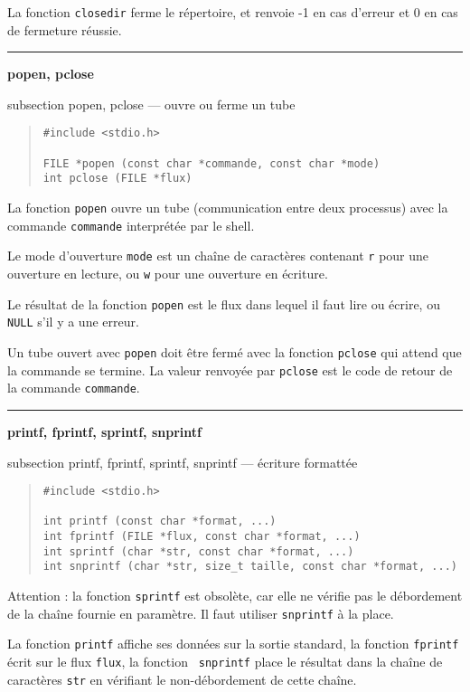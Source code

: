 \documentclass [twoside] {report}
\newcommand {\primitive} [1]
    {
	{\large \bf #1}
	\addcontentsline {toc} {subsection} {#1}
    }
\newcommand {\separation}
    {
	\vspace {7mm}
	\nopagebreak
	\hrule
    }
\begin{document}
La fonction {\tt closedir} ferme le répertoire, et renvoie -1 en cas
d'erreur et 0 en cas de fermeture réussie.


\separation
\primitive {popen, pclose} --- ouvre ou ferme un tube

\begin {quote}
\begin {verbatim}
#include <stdio.h>

FILE *popen (const char *commande, const char *mode)
int pclose (FILE *flux)
\end{verbatim}
\end {quote}

La fonction {\tt popen} ouvre un tube (communication entre
deux processus) avec la commande {\tt commande} interprétée par
le shell.

Le mode d'ouverture {\tt mode} est un chaîne de caractères
contenant {\tt r} pour une ouverture en lecture, ou {\tt w} pour
une ouverture en écriture.

Le résultat de la fonction {\tt popen} est le flux dans lequel
il faut lire ou écrire, ou {\tt NULL} s'il y a une erreur.

Un tube ouvert avec {\tt popen} doit être fermé avec la
fonction {\tt pclose} qui attend que la commande se termine. La
valeur renvoyée par {\tt pclose} est le code de retour de la
commande {\tt commande}.



\separation
\primitive {printf, fprintf, sprintf, snprintf} --- écriture formattée

\begin {quote}
\begin {verbatim}
#include <stdio.h>

int printf (const char *format, ...)
int fprintf (FILE *flux, const char *format, ...)
int sprintf (char *str, const char *format, ...)
int snprintf (char *str, size_t taille, const char *format, ...)
\end{verbatim}
\end {quote}

Attention : la fonction \texttt {sprintf} est obsolète, car elle ne
vérifie pas le débordement de la chaîne fournie en paramètre. Il faut
utiliser \texttt {snprintf} à la place.

La fonction {\tt printf} affiche ses données sur la sortie standard, la
fonction {\tt fprintf} écrit sur le flux {\tt flux}, la fonction {\tt
snprintf} place le résultat dans la chaîne de caractères {\tt str} en
vérifiant le non-débordement de cette chaîne.
\end{document}
